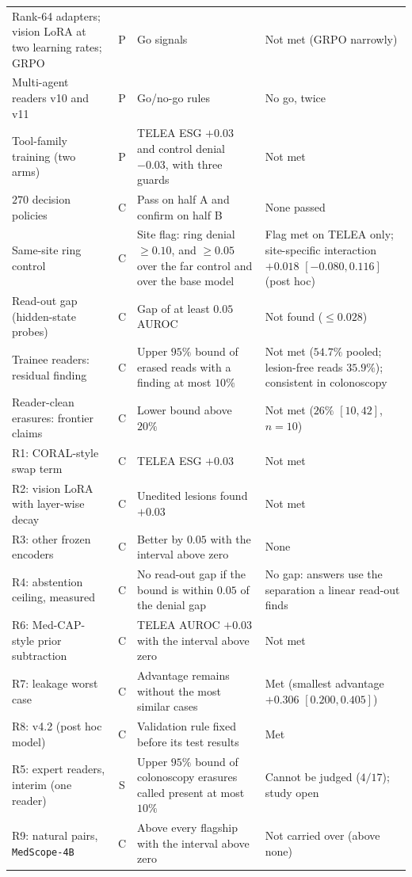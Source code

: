 \documentclass[5p,times,twocolumn,authoryear]{elsarticle}
\begin{document}
\begin{table}[!htbp]
\begin{center}
\begin{adjustbox}{max width=\linewidth}
\begin{tabular}{L{4.6cm}cL{5.2cm}L{6.0cm}}
Rank-64 adapters; vision LoRA at two learning rates; GRPO & P & Go signals & Not met (GRPO narrowly) \\
Multi-agent readers v10 and v11 & P & Go/no-go rules & No go, twice \\
Tool-family training (two arms) & P & TELEA ESG $+0.03$ and control denial $-0.03$, with three guards & Not met \\
$270$ decision policies & C & Pass on half A and confirm on half B & None passed \\
Same-site ring control & C & Site flag: ring denial $\ge 0.10$, and $\ge 0.05$ over the far control and over the base model & Flag met on TELEA only; site-specific interaction $+0.018$ $[-0.080, 0.116]$ (post hoc) \\
Read-out gap (hidden-state probes) & C & Gap of at least $0.05$ AUROC & Not found ($\le 0.028$) \\
Trainee readers: residual finding & C & Upper $95\%$ bound of erased reads with a finding at most $10\%$ & Not met ($54.7\%$ pooled; lesion-free reads $35.9\%$); consistent in colonoscopy \\
Reader-clean erasures: frontier claims & C & Lower bound above $20\%$ & Not met ($26\%$ $[10, 42]$, $n = 10$) \\
R1: CORAL-style swap term & C & TELEA ESG $+0.03$ & Not met \\
R2: vision LoRA with layer-wise decay & C & Unedited lesions found $+0.03$ & Not met \\
R3: other frozen encoders & C & Better by $0.05$ with the interval above zero & None \\
R4: abstention ceiling, measured & C & No read-out gap if the bound is within $0.05$ of the denial gap & No gap: answers use the separation a linear read-out finds \\
R6: Med-CAP-style prior subtraction & C & TELEA AUROC $+0.03$ with the interval above zero & Not met \\
R7: leakage worst case & C & Advantage remains without the most similar cases & Met (smallest advantage $+0.306$ $[0.200, 0.405]$) \\
R8: v4.2 (post hoc model) & C & Validation rule fixed before its test results & Met \\
R5: expert readers, interim (one reader) & S & Upper $95\%$ bound of colonoscopy erasures called present at most $10\%$ & Cannot be judged ($4/17$); study open \\
R9: natural pairs, \texttt{MedScope-4B} & C & Above every flagship with the interval above zero & Not carried over (above none) \\

\end{tabular}
\end{adjustbox}
\end{center}
\end{table}
\end{document}
